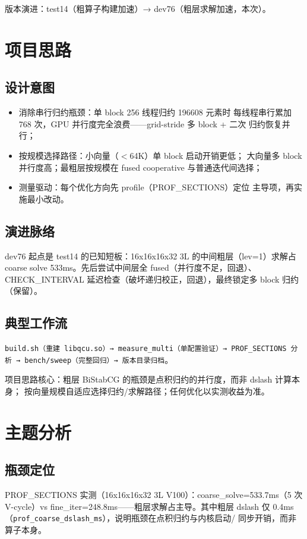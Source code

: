 \documentclass[UTF8]{ctexart}
\begin{document}
版本演进：test14（粗算子构建加速）→ dev76（粗层求解加速，本次）。

\section{项目思路}
\subsection{设计意图}
\begin{itemize}
\item \textcolor{idea}{消除串行归约瓶颈}：单 block 256 线程归约 196608 元素时
  每线程串行累加 768 次，GPU 并行度完全浪费——grid-stride 多 block + 二次
  归约恢复并行；
\item \textcolor{idea}{按规模选择路径}：小向量（$<$64K）单 block 启动开销更低；
  大向量多 block 并行度高；最粗层按规模在 fused cooperative 与普通迭代间选择；
\item \textcolor{idea}{测量驱动}：每个优化方向先 profile（PROF\_SECTIONS）定位
  主导项，再实施最小改动。
\end{itemize}
\subsection{演进脉络}
dev76 起点是 test14 的已知短板：16x16x16x32 3L 的中间粗层（lev=1）求解占
coarse solve 533ms。先后尝试中间层全 fused（并行度不足，回退）、CHECK\_INTERVAL
延迟检查（破坏递归校正，回退），最终锁定多 block 归约（保留）。
\subsection{典型工作流}
\texttt{build.sh（重建 libqcu.so）→ measure\_multi（单配置验证）→
PROF\_SECTIONS 分析 → bench/sweep（完整回归）→ 版本目录归档}。

\begin{ideabox}
项目思路核心：粗层 BiStabCG 的瓶颈是点积归约的并行度，而非 dslash 计算本身；
按向量规模自适应选择归约/求解路径；任何优化以实测收益为准。
\end{ideabox}

\section{主题分析}
\subsection{瓶颈定位}
PROF\_SECTIONS 实测（16x16x16x32 3L V100）：coarse\_solve=533.7ms（5 次
V-cycle）vs fine\_iter=248.8ms——粗层求解占主导。其中粗层 dslash 仅
0.4ms（\texttt{prof\_coarse\_dslash\_ms}），说明瓶颈在点积归约与内核启动/
同步开销，而非算子本身。
\end{document}
